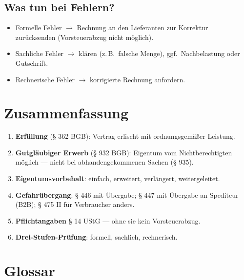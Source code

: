 \documentclass[11pt, a4paper]{article}
\begin{document}
\subsection{Was tun bei Fehlern?}

\begin{itemize}[itemsep=2pt]
  \item Formelle Fehler $\to$ Rechnung an den Lieferanten zur Korrektur zurücksenden (Vorsteuerabzug nicht möglich).
  \item Sachliche Fehler $\to$ klären (z.\,B.\ falsche Menge), ggf.\ Nachbelastung oder Gutschrift.
  \item Rechnerische Fehler $\to$ korrigierte Rechnung anfordern.
\end{itemize}

\section{Zusammenfassung}

\begin{enumerate}[itemsep=2pt]
  \item \textbf{Erfüllung} (§ 362 BGB): Vertrag erlischt mit ordnungsgemäßer Leistung.
  \item \textbf{Gutgläubiger Erwerb} (§ 932 BGB): Eigentum vom Nichtberechtigten möglich --- nicht bei abhandengekommenen Sachen (§ 935).
  \item \textbf{Eigentumsvorbehalt}: einfach, erweitert, verlängert, weitergeleitet.
  \item \textbf{Gefahrübergang}: § 446 mit Übergabe; § 447 mit Übergabe an Spediteur (B2B); § 475 II für Verbraucher anders.
  \item \textbf{Pflichtangaben} § 14 UStG --- ohne sie kein Vorsteuerabzug.
  \item \textbf{Drei-Stufen-Prüfung}: formell, sachlich, rechnerisch.
\end{enumerate}

\newpage

\section*{Glossar}


\end{document}
